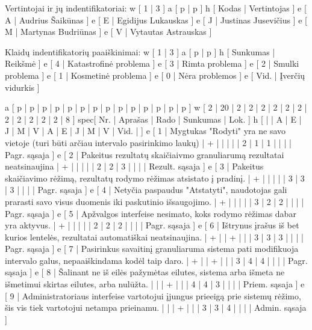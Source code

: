 Vertintojai ir jų indentifikatoriai:
\xtableu
{
  w [ 1 | 3 ]
  a [ p | p ]
  h [ Kodas | Vertintojas ]
  e [ A | Audrius Šaikūnas ]
  e [ E | Egidijus Lukauskas ]
  e [ J | Justinas Jusevičius ]
  e [ M | Martynas Budriūnas ]
  e [ V | Vytautas Astrauskas ]
}

Klaidų indentifikatorių paaiškinimai:
\xtableu
{
  w [ 1 | 3 ]
  a [ p | p ]
  h [ Sunkumas | Reikšmė ]
  e [ 4 | Katastrofinė problema ]
  e [ 3 | Rimta problema ]
  e [ 2 | Smulki problema ]
  e [ 1 | Kosmetinė problema ]
  e [ 0 | Nėra problemos ]
  e [ Vid. | Įverčių vidurkis ]
}

\xtableu
{
  a [ p   | p       | p | p | p | p | p | p | p | p | p | p | p    | p    ]
  w [ 2   | 20      | 2 | 2 | 2 | 2 | 2 | 2 | 2 | 2 | 2 | 2 | 2    | 8    ]
spec[ Nr. | Aprašas | Rado              | Sunkumas                 | Lok. ]
  h [     |         | A | E | J | M | V | A | E | J | M | V | Vid. |      ]
  e [ 1   | Mygtukas "Rodyti" yra ne savo vietoje (turi būti arčiau intervalo 
  pasirinkimo laukų)
                    | + |   |   |   |   | 2 | 1 | 1 |   |   |      | Pagr. sąsaja ]
  e [ 2   | Pakeitus rezultatų skaičiaivmo granuliarumą rezultatai neatsinaujina
                    | + |   |   |   |   | 2 | 2 | 3 |   |   |      | Rezult. sąsaja ]
  e [ 3   | Pakeitus skaičiavimo rėžimą, rezultatų rodymo rėžimas atsistato
  į pradinį.
                    | + |   |   |   |   | 3 | 3 | 3 |   |   |      | Pagr. sąsaja ]
  e [ 4   | Netyčia paspaudus "Atstatyti", naudotojas gali prarasti savo visus duomenis
  iki paskutinio išsaugojimo. 
                    | + |   |   |   |   | 3 | 2 | 2 |   |   |      | Pagr. sąsaja ]
  e [ 5   | Apžvalgos interfeise nesimato, koks rodymo rėžimas dabar yra aktyvus.
                    | + |   |   |   |   | 2 | 2 | 2 |   |   |      | Pagr. sąsaja ]
  e [ 6   | Ištrynus įrašus iš bet kurios lentelės, rezultatai automatiškai neatsinaujina.
                    | + |   | + |   |   | 3 | 3 | 3 |   |   |      | Pagr. sąsaja ]
  e [ 7   | Pasirinkus savaitinį granuliaruma sistema pati modifikuoja intervalo galus,
  nepaaiškindama kodėl taip daro.
                    | + |   | + |   |   | 3 | 4 | 4 |   |   |      | Pagr. sąsaja ]
  e [ 8   | Šalinant ne iš eilės pažymėtas eilutes, sistema arba išmeta ne išmetimui
  skirtas eilutes, arba nulūžta.  
                    |   |   | + |   |   | 4 | 4 | 3 |   |   |      | Priem. sąsaja ]
  e [ 9   | Administratoriaus interfeise vartotojui įjungus prieeigą prie sistemų
  rėžimo, šis vis tiek vartotojui netampa prieinamu.     
                    |   |   | + |   |   | 3 | 3 | 4 |   |   |      | Admin. sąsaja ]
}
